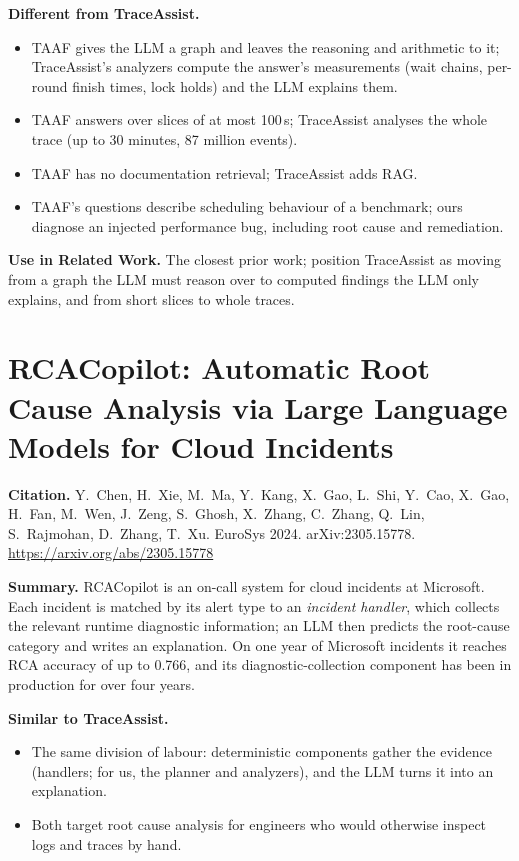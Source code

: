 \documentclass[11pt]{article}
\newcommand{\sysname}{TraceAssist\xspace}
\begin{document}
\textbf{Different from \sysname.}
\begin{itemize}
  \item TAAF gives the LLM a graph and leaves the reasoning and arithmetic to
        it; \sysname's analyzers compute the answer's measurements (wait
        chains, per-round finish times, lock holds) and the LLM explains them.
  \item TAAF answers over slices of at most 100\,s; \sysname analyses the
        whole trace (up to 30 minutes, 87 million events).
  \item TAAF has no documentation retrieval; \sysname adds RAG.
  \item TAAF's questions describe scheduling behaviour of a benchmark;
        ours diagnose an injected performance bug, including root cause and
        remediation.
\end{itemize}

\textbf{Use in Related Work.} The closest prior work; position \sysname as
moving from a graph the LLM must reason over to computed findings the LLM
only explains, and from short slices to whole traces.

\section{RCACopilot: Automatic Root Cause Analysis via Large Language Models
for Cloud Incidents}

\textbf{Citation.} Y.~Chen, H.~Xie, M.~Ma, Y.~Kang, X.~Gao, L.~Shi, Y.~Cao,
X.~Gao, H.~Fan, M.~Wen, J.~Zeng, S.~Ghosh, X.~Zhang, C.~Zhang, Q.~Lin,
S.~Rajmohan, D.~Zhang, T.~Xu. EuroSys 2024. arXiv:2305.15778.
\url{https://arxiv.org/abs/2305.15778}

\textbf{Summary.} RCACopilot is an on-call system for cloud incidents at
Microsoft. Each incident is matched by its alert type to an \emph{incident
handler}, which collects the relevant runtime diagnostic information; an LLM
then predicts the root-cause category and writes an explanation. On one
year of Microsoft incidents it reaches RCA accuracy of up to 0.766, and its
diagnostic-collection component has been in production for over four years.

\textbf{Similar to \sysname.}
\begin{itemize}
  \item The same division of labour: deterministic components gather the
        evidence (handlers; for us, the planner and analyzers), and the LLM
        turns it into an explanation.
  \item Both target root cause analysis for engineers who would otherwise
        inspect logs and traces by hand.
\end{itemize}
\end{document}

